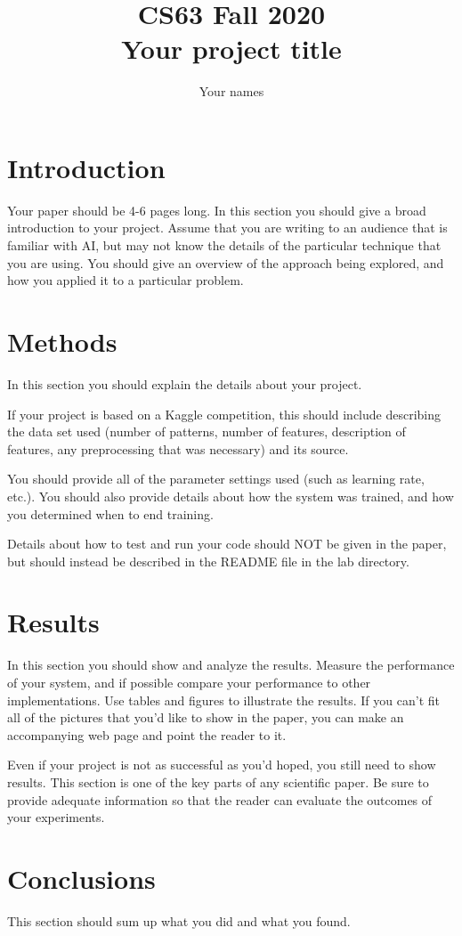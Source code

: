 \documentclass[11pt]{article}
\title{CS63 Fall 2020\\Your project title}
\author{Your names}
\date{}
\begin{document}
\maketitle

\section{Introduction}

Your paper should be 4-6 pages long.  In this section you should give
a broad introduction to your project.  Assume that you are writing to
an audience that is familiar with AI, but may not know the details of
the particular technique that you are using.  You should give an
overview of the approach being explored, and how you applied it to a
particular problem.

\section{Methods}

In this section you should explain the details about your project.

If your project is based on a Kaggle competition, this should include
describing the data set used (number of patterns, number of features,
description of features, any preprocessing that was necessary) and its
source.

You should provide all of the parameter settings used (such as
learning rate, etc.).  You should also provide details about how the
system was trained, and how you determined when to end training.

Details about how to test and run your code should NOT be given in the
paper, but should instead be described in the README file in the lab
directory.

\section{Results}

In this section you should show and analyze the results.  Measure the
performance of your system, and if possible compare your performance
to other implementations. Use tables and figures to illustrate the
results.  If you can't fit all of the pictures that you'd like to show
in the paper, you can make an accompanying web page and point the
reader to it.

Even if your project is not as successful as you'd hoped, you still
need to show results.  This section is one of the key parts of any
scientific paper.  Be sure to provide adequate information so that the
reader can evaluate the outcomes of your experiments.

\section{Conclusions}

This section should sum up what you did and what you found.  
\end{document}
